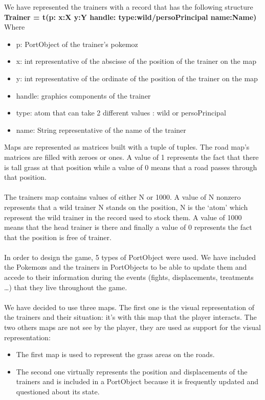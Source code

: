 \documentclass[a4paper,10pt]{article}
\begin{document}
We have represented the trainers with a record that has the following structure \\
\textbf{Trainer = t(p: x:X y:Y handle: type:wild/persoPrincipal name:Name)}\\
Where 
\begin{itemize}
\item   	p: PortObject of the trainer’s pokemoz
\item x: int representative of the abscisse of the position of the trainer on the map 
\item y: int representative of the ordinate of the position of the trainer on the map 
\item handle: graphics components of the trainer 
\item type: atom that can take 2 different values : wild or persoPrincipal
\item name: String representative of the name of the trainer \\
\end{itemize}


Maps are represented as matrices built with a tuple of tuples. The road map’s matrices are filled with zeroes or ones. A value of 1 represents the fact that there is tall grass at that position while a value of 0 means that a road passes through that position.

\paragraph{}
The trainers map contains values of either N or 1000. A value of  N nonzero  represents that a wild trainer N stands on the position, N is the ‘atom’ which represent the wild trainer in the record used to stock them. A value of 1000 means that the head trainer is there and finally a value of 0 represents the fact that the position is free of trainer.

\paragraph{}
In order to design the game, 5 types of PortObject were used. We have included the Pokemozs and the trainers in PortObjects to be able to update them and accede to their information during the events (fights, displacements, treatments …) that they live throughout the game.  

\paragraph{}
We have decided to use three maps. 
The first one is the visual representation of the trainers and their situation: it’s with this map that the player interacts. 
The two others maps are not see by the player, they are used as support for the visual representation: 
\begin{itemize}
\item The first map is used to represent the grass areas on the roads. 
\item The second one virtually represents the position and displacements of the trainers and is included in a PortObject because it is frequently updated and questioned about its state. 
\end{itemize}
\end{document}
